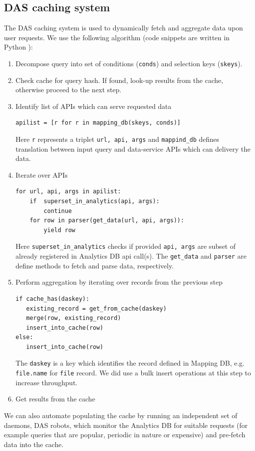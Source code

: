 \documentclass[1p,times]{elsarticle}
\begin{document}

\subsection{DAS caching system}
The DAS caching system is used to dynamically fetch
and aggregate data upon user requests. We use the following 
algorithm (code snippets are written in Python \cite{Python}):
\begin{enumerate}[1.]
\item Decompose query into set of conditions (\verb+conds+) 
and selection keys (\verb+skeys+).
\item Check cache for query hash. If found, look-up results from the cache,
otherwise proceed to the next step.
\item Identify list of APIs which can serve requested data
\begin{verbatim}
apilist = [r for r in mapping_db(skeys, conds)]
\end{verbatim}
Here \verb+r+ represents a triplet \verb+url, api, args+ and 
\verb+mappind_db+ defines translation between input query and data-service
APIs which can delivery the data.
\item Iterate over APIs
\begin{verbatim}
for url, api, args in apilist:
    if  superset_in_analytics(api, args):
        continue
    for row in parser(get_data(url, api, args)):
        yield row
\end{verbatim}
Here \verb+superset_in_analytics+ checks if provided \verb+api, args+
are subset of already registered in Analytics DB api call(s). The 
\verb+get_data+ and \verb+parser+ are define methods to fetch and parse
data, respectively.
\item Perform aggregation by iterating over records from the previous step
\begin{verbatim}
if cache_has(daskey):
   existing_record = get_from_cache(daskey)
   merge(row, existing_record)
   insert_into_cache(row)
else:
   insert_into_cache(row)
\end{verbatim}
The \verb+daskey+
is a key which identifies the record defined in Mapping DB, e.g. \verb+file.name+
for \verb+file+ record.
We did use a bulk insert operations at this step to increase throughput. 
\item Get results from the cache
\end{enumerate}
We can also automate populating the cache by running an 
independent set of daemons, DAS robots, which monitor the 
Analytics DB for suitable requests (for example queries that are 
popular, periodic in nature or expensive) and pre-fetch data into the cache. 
\end{document}
